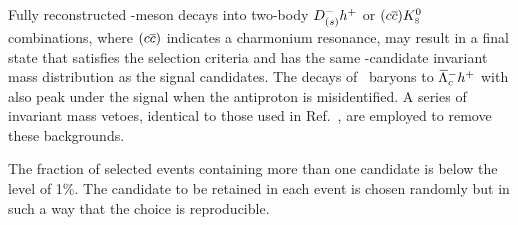 Fully reconstructed \B-meson decays into two-body ${{D}^-_{({s})}}h^+$ or
$({c}{\overline {{c}}}){{K}^0_{\mathrm{ \scriptscriptstyle S}}}$ combinations, where $({c}{\overline {{c}}})$
indicates a charmonium resonance, may result in a \Kshhp final state that
satisfies the selection criteria and has the same \B-candidate
invariant mass distribution as the signal candidates.
The decays of \Lbbar\ baryons to ${{\kern 0.1em\overline{\kern -0.1em\Lambda}}{}^-_{c}}h^+$ with \decay{\Lcbar}{\antiproton\KS} also
peak under the signal when the antiproton is misidentified.
A series of invariant mass vetoes, identical to those used in
Ref.~\cite{LHCb-PAPER-2017-010}, are employed to remove these backgrounds.

The fraction of selected events containing more than one \B candidate is
below the level of 1\%.
The candidate to be retained in each event is chosen randomly but in such a
way that the choice is reproducible.


